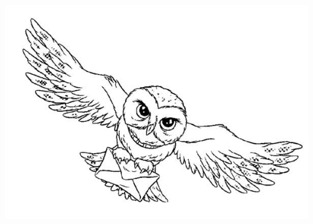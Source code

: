 \documentclass[17pt]{beamer}
\begin{document}
\begin{frame}



\begin{flushleft}
\href{mailto:vineeshvsjobs@gmail.com?subject=Bug report || Beamer template error & body=Hi,I found a bug in your Beamer template}{\includegraphics[scale=0.1]{images/send_an_owl.jpg}}
\end{flushleft}



\end{frame}
\end{document}
